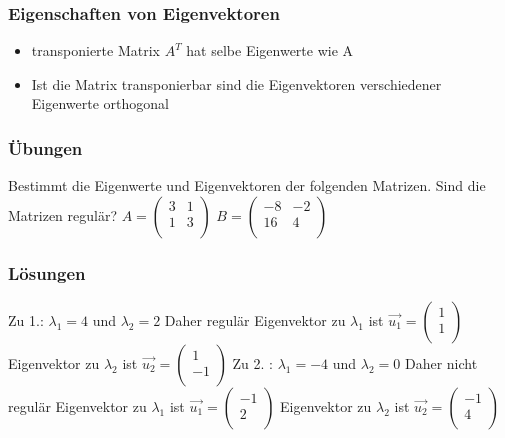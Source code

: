 \begin{frame}
    \frametitle{Eigenschaften von Eigenvektoren}
    \begin{itemize}
        \item transponierte Matrix $A ^{T}$ hat selbe Eigenwerte wie A
        \item Ist die Matrix transponierbar sind die Eigenvektoren verschiedener Eigenwerte orthogonal
    \end{itemize}
\end{frame}

\begin{frame}
    \frametitle{Übungen}
    Bestimmt die Eigenwerte und Eigenvektoren der folgenden Matrizen. Sind die Matrizen regulär?
    \newline
    $A = \begin{pmatrix}
        3 & 1 \\
        1 & 3 \\
    \end{pmatrix}$
    \newline
    $B = \begin{pmatrix}
        -8 & -2 \\
        16 & 4 \\
    \end{pmatrix}$
\end{frame}

\begin{frame}
    \frametitle{Lösungen}
    Zu 1.: $\lambda_1 = 4$ und $\lambda_2 = 2$ Daher regulär
    \newline
    Eigenvektor zu $\lambda_1$ ist $\vec{u_1} = \begin{pmatrix}
        1 \\
        1 \\
    \end{pmatrix}$
    \newline
    Eigenvektor zu $\lambda_2$ ist $\vec{u_2} = \begin{pmatrix}
        1 \\
        -1 \\
    \end{pmatrix}$
    \vspace{0.3cm}
 \newline
    Zu 2. : $\lambda_1 = -4$ und $\lambda_2 = 0$ Daher nicht regulär
    \newline
    Eigenvektor zu $\lambda_1$ ist $\vec{u_1} = \begin{pmatrix}
        -1 \\
        2 \\
    \end{pmatrix}$
    \newline
    Eigenvektor zu $\lambda_2$ ist $\vec{u_2} = \begin{pmatrix}
        -1 \\
        4 \\
    \end{pmatrix}$
\end{frame}